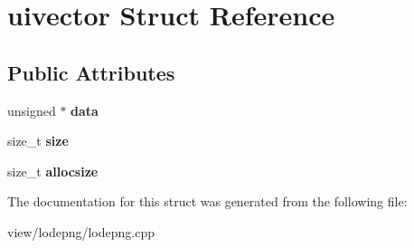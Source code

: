 \hypertarget{structuivector}{\section{uivector Struct Reference}
\label{structuivector}
}
\subsection*{Public Attributes}
\begin{DoxyCompactItemize}
\item 
\hypertarget{structuivector_a427d761df4bb4f0f19b4a973fc224c78}{unsigned $\ast$ {\bfseries data}}\label{structuivector_a427d761df4bb4f0f19b4a973fc224c78}

\item 
\hypertarget{structuivector_aa999025945f0c93d0461192475ae2720}{size\-\_\-t {\bfseries size}}\label{structuivector_aa999025945f0c93d0461192475ae2720}

\item 
\hypertarget{structuivector_aac0395a9ad397ae7a28219561ab49ffa}{size\-\_\-t {\bfseries allocsize}}\label{structuivector_aac0395a9ad397ae7a28219561ab49ffa}

\end{DoxyCompactItemize}


The documentation for this struct was generated from the following file\-:\begin{DoxyCompactItemize}
\item 
view/lodepng/lodepng.\-cpp\end{DoxyCompactItemize}

